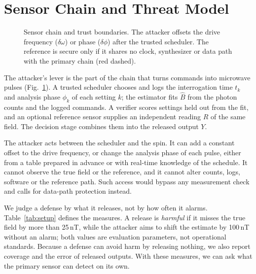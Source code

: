 \documentclass[conference,9pt]{IEEEtran}
\newcommand{\Bhat}{\widehat{B}}
\begin{document}
\section{Sensor Chain and Threat Model}
\label{sec:threat}

\begin{figure}[t]
\centering

\caption{Sensor chain and trust boundaries. The attacker offsets the drive frequency ($\delta\omega$)
or phase ($\delta\phi$) after the trusted scheduler. The reference is secure only if it shares no
clock, synthesizer or data path with the primary chain (red dashed).}
\label{fig:chain}
\end{figure}

The attacker's lever is the part of the chain that turns commands into microwave pulses
(Fig.~\ref{fig:chain}). A trusted scheduler chooses and logs the interrogation time $t_k$ and analysis phase $\phi_k$ of
each setting $k$; the estimator fits $\Bhat$ from the photon counts and the logged commands. A verifier scores settings held out from the fit, and an optional reference
sensor supplies an independent reading $R$ of the same field. The decision stage combines them
into the released output $Y$.

The attacker acts between the scheduler and the spin. It can add a constant offset to the drive
frequency, or change the analysis phase of each pulse, either from a table prepared in advance or
with real-time knowledge of the schedule. It cannot observe the true field or the reference, and
it cannot alter counts, logs, software or the reference path. Such access would bypass any measurement check and calls for data-path protection instead.

We judge a defense by what it releases, not by how often it alarms. Table~\ref{tab:setup} defines
the measures. A release is \emph{harmful} if it misses the true field by more than 25\,nT, while the
attacker aims to shift the estimate by 100\,nT without an alarm; both values are evaluation
parameters, not operational standards. Because a defense can avoid harm by releasing nothing, we
also report coverage and the error of released outputs. With these measures, we can ask what the
primary sensor can detect on its own.
\end{document}
